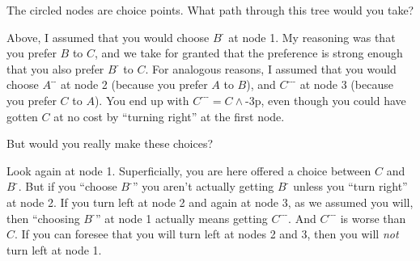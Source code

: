 \begin{center}
\end{center}

The circled nodes are choice points. What path through this tree would you take?

Above, I assumed that you would choose $B^{\text{-}}$ at node 1. My reasoning
was that you prefer $B$ to $C$, and we take for granted that the preference is
strong enough that you also prefer $B^{\text{-}}$ to $C$. For analogous reasons,
I assumed that you would choose $A^{\text{-}\text{-}}$ at node 2 (because you
prefer $A$ to $B$), and $C^{\text{-}\text{-}\text{-}}$ at node 3 (because you
prefer $C$ to $A$). You end up with $C^{\text{-}\text{-}\text{-}} = C \land $-3p,
even though you could have gotten $C$ at no cost by ``turning right'' at the
first node.

But would you really make these choices?

Look again at node 1. Superficially, you are here offered a choice between $C$
and $B^{\text{-}}$. But if you ``choose $B^{\text{-}}$'' you aren't actually
getting $B^{\text{-}}$ unless you ``turn right'' at node 2. If you turn left at
node 2 and again at node 3, as we assumed you will, then ``choosing
$B^{\text{-}}$'' at node 1 actually means getting
$C^{\text{-}\text{-}\text{-}}$. And $C^{\text{-}\text{-}\text{-}}$ is worse than
$C$. If you can foresee that you will turn left at nodes 2 and 3, then you will
\emph{not} turn left at node 1.

